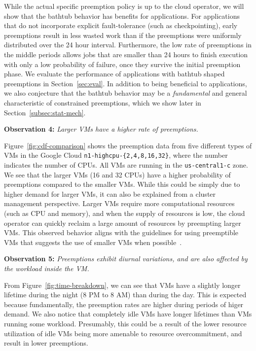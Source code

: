 While the actual specific preemption policy is up to the cloud operator, we will show that the bathtub behavior has benefits for applications. 
For applications that do not incorporate explicit fault-tolerance (such as checkpointing), early preemptions result in less wasted work than if the preemptions were uniformly distributed over the 24 hour interval.
Furthermore, the low rate of preemptions in the middle periods allows jobs that are smaller than 24 hours to finish execution with only a low probability of failure, once they survive the initial preemption phase. 
We evaluate the performance of applications with bathtub shaped preemptions in Section~\ref{sec:eval}. 
%
In addition to being beneficial to applications, we also conjecture that the bathtub behavior may be  a \emph{fundamental} and general characteristic of constrained preemptions, which we show later in Section~\ref{subsec:stat-mech}. 
%


\noindent \textbf{Observation 4:}\emph{ Larger VMs have a higher rate of preemptions.}

Figure~\ref{fig:cdf-comparison} shows the preemption data from five different types of VMs in the Google Cloud \texttt{n1-highcpu-\{2,4,8,16,32\}}, where the number indicates the number of CPUs.
All VMs are running in the \texttt{us-central1-c} zone. 
We see that the larger VMs (16 and 32 CPUs) have a higher probability of preemptions compared to the smaller VMs.
While this could be simply due to higher demand for larger VMs, it can also be explained from a cluster management perspective. 
Larger VMs require more computational resources (such as CPU and memory), and when the supply of resources is low, the cloud operator can quickly reclaim a large amount of resources by preempting larger VMs.
This observed behavior aligns with the guidelines for using preemptible VMs that suggests the use of smaller VMs when possible~\cite{preemptible-documentation}. 

\noindent \textbf{Observation 5:} \emph{Preemptions exhibit diurnal variations, and are also affected by the workload inside the VM.}

From Figure~\ref{fig:time-breakdown}, we can see that VMs have a slightly longer lifetime during the night (8 PM to 8 AM) than during the day.
This is expected because fundamentally, the preemption rates are higher during periods of higer demand. 
%
We also notice that completely idle VMs have longer lifetimes than VMs running some workload.
Presumably, this could be a result of the lower resource utilization of idle VMs being more amenable to resource overcommitment, and result in lower preemptions. 


